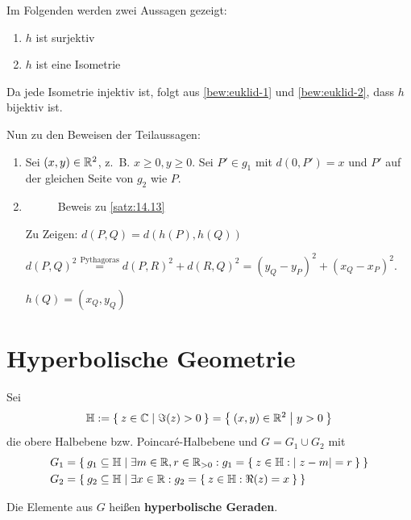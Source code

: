 \begin{beweis}
\begin{enumerate}[label=(\roman*)]
			Im Folgenden werden zwei Aussagen gezeigt:
			\begin{enumerate}[label=(\roman*)]
				\item \label{bew:euklid-1} $h$ ist surjektiv
				\item \label{bew:euklid-2} $h$ ist eine Isometrie
			\end{enumerate}

			Da jede Isometrie injektiv ist, folgt aus \ref{bew:euklid-1}
			und \ref{bew:euklid-2}, dass $h$ bijektiv ist.

			Nun zu den Beweisen der Teilaussagen:

		 	\begin{enumerate}[label=(\roman*)]
				\item Sei $(x, y) \in \mathbb{R}^2$, z.~B. $x \geq 0, y \geq 0$.
                Sei $P' \in g_1$ mit $d(0, P') = x$ und
                $P'$ auf der gleichen Seite von $g_2$ wie $P$.
				\item \begin{figure}[htp]
                    \centering
                    
                    \caption{Beweis zu \cref{satz:14.13}}
                    \label{fig:14.13.0.1}
                \end{figure}
                Zu Zeigen: $d(P, Q) = d(h(P), h(Q))$

                $d(P, Q)^2 \overset{\text{Pythagoras}}{=} d(P, R)^2 + d(R, Q)^2 = (y_Q - y_P)^2 + (x_Q - x_P)^2$.

                $h(Q) = (x_Q, y_Q)$
			\end{enumerate}
    \end{enumerate}
\end{beweis}
\section{Hyperbolische Geometrie}
\begin{definition}%
    Sei
        \[\mathbb{H}:= \Set{z \in \ensuremath{\mathbb{C}}| \Im(z) > 0} = \Set{(x,y) \in \ensuremath{\mathbb{R}}^2 | y > 0}\]
    die obere Halbebene bzw. Poincaré-Halbebene und $G = G_1 \cup G_2$
    mit
        \begin{align*}
            G_1 &= \Set{g_1 \subseteq \ensuremath{\mathbb{H}}| \exists m \in \ensuremath{\mathbb{R}}, r \in \ensuremath{\mathbb{R}}_{>0}: g_1 = \Set{z \in \ensuremath{\mathbb{H}}: |z-m|=r}}\\
            G_2 &= \Set{g_2 \subseteq \ensuremath{\mathbb{H}}| \exists x \in \ensuremath{\mathbb{R}}: g_2 = \Set{z \in \ensuremath{\mathbb{H}}: \Re(z) = x}}
        \end{align*}

    Die Elemente aus $G$ heißen \textbf{hyperbolische Geraden}.
\end{definition}

